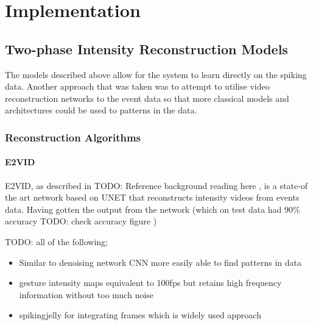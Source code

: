\chapter{Implementation} \label{chap:implementation}




\section{Two-phase Intensity Reconstruction Models}

The models described above allow for the system to learn directly on the spiking data. Another approach that was taken was to attempt to utilise video reconstruction networks to the event data so that more classical models and architectures could be used to patterns in the data.

\subsection{Reconstruction Algorithms}

\subsubsection{E2VID}

E2VID, as described in \color{red} TODO: Reference background reading here \color{black}, is a state-of the art network based on UNET that reconstructs intensity videos from events data. Having gotten the output from the network (which on test data had 90\% accuracy \color{red} TODO: check accuracy figure \color{black})

\color{red} TODO: all of the following;

\begin{itemize}
    \item Similar to denoising network CNN more easily able to find patterns in data
    \item gesture intensity maps equivalent to 100fps but retains high frequency information without too much noise
    \item spikingjelly for integrating frames which is widely used approach
\end{itemize}

